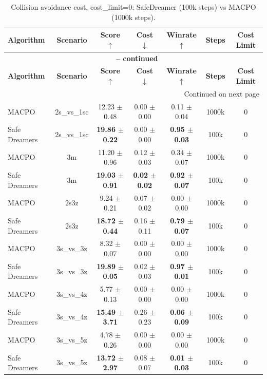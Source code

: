 \begin{longtable}{lcccccc}
\caption{Collision avoidance cost, cost\_limit=0: SafeDreamer (100k steps) vs MACPO (1000k steps).}
\label{tab:collision_comparison_100k_1m} \\
\toprule
\textbf{Algorithm} & \textbf{Scenario} & \textbf{Score} $\uparrow$ & \textbf{Cost} $\downarrow$ & \textbf{Winrate} $\uparrow$ & \textbf{Steps} & \textbf{Cost Limit} \\
\midrule
\endfirsthead
\multicolumn{7}{c}{{\bfseries \tablename\ \thetable{} -- continued}} \\
\toprule
\textbf{Algorithm} & \textbf{Scenario} & \textbf{Score} $\uparrow$ & \textbf{Cost} $\downarrow$ & \textbf{Winrate} $\uparrow$ & \textbf{Steps} & \textbf{Cost Limit} \\
\midrule
\endhead
\midrule \multicolumn{7}{r}{{Continued on next page}} \\
\endfoot
\bottomrule
\endlastfoot
MACPO & 2s\_vs\_1sc & 12.23 $\pm$ 0.48 & 0.00 $\pm$ 0.00 & 0.11 $\pm$ 0.04 & 1000k & 0 \\
Safe Dreamers & 2s\_vs\_1sc & \textbf{19.86 $\pm$ 0.22} & 0.00 $\pm$ 0.00 & \textbf{0.95 $\pm$ 0.03} & 100k & 0 \\
\midrule
MACPO & 3m & 11.20 $\pm$ 0.96 & 0.12 $\pm$ 0.03 & 0.34 $\pm$ 0.07 & 1000k & 0 \\
Safe Dreamers & 3m & \textbf{19.03 $\pm$ 0.91} & \textbf{0.02 $\pm$ 0.02} & \textbf{0.92 $\pm$ 0.07} & 100k & 0 \\
\midrule
MACPO & 2s3z & 9.24 $\pm$ 0.21 & 0.07 $\pm$ 0.02 & 0.00 $\pm$ 0.00 & 1000k & 0 \\
Safe Dreamers & 2s3z & \textbf{18.72 $\pm$ 0.44} & 0.16 $\pm$ 0.11 & \textbf{0.79 $\pm$ 0.07} & 100k & 0 \\
\midrule
MACPO & 3s\_vs\_3z & 8.32 $\pm$ 0.07 & 0.00 $\pm$ 0.00 & 0.00 $\pm$ 0.00 & 1000k & 0 \\
Safe Dreamers & 3s\_vs\_3z & \textbf{19.89 $\pm$ 0.05} & 0.02 $\pm$ 0.03 & \textbf{0.97 $\pm$ 0.01} & 100k & 0 \\
\midrule
MACPO & 3s\_vs\_4z & 5.77 $\pm$ 0.13 & 0.00 $\pm$ 0.00 & 0.00 $\pm$ 0.00 & 1000k & 0 \\
Safe Dreamers & 3s\_vs\_4z & \textbf{15.49 $\pm$ 3.71} & 0.26 $\pm$ 0.23 & \textbf{0.06 $\pm$ 0.09} & 100k & 0 \\
\midrule
MACPO & 3s\_vs\_5z & 4.78 $\pm$ 0.26 & 0.00 $\pm$ 0.00 & 0.00 $\pm$ 0.00 & 1000k & 0 \\
Safe Dreamers & 3s\_vs\_5z & \textbf{13.72 $\pm$ 2.97} & 0.08 $\pm$ 0.07 & \textbf{0.01 $\pm$ 0.03} & 100k & 0 \\

\end{longtable}
